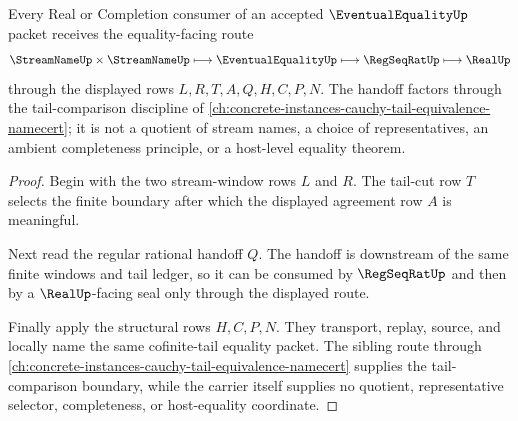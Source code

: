 \begin{theorem}
\label{thm:eventual-equality-regseqrat-handoff}
Every Real or Completion consumer of an accepted $\EventualEqualityUp$ packet receives the equality-facing route
$$
\StreamNameUp \times \StreamNameUp \longmapsto \EventualEqualityUp \longmapsto \RegSeqRatUp \longmapsto \RealUp
$$
through the displayed rows $L,R,T,A,Q,H,C,P,N$. The handoff factors through the tail-comparison discipline of \autoref{ch:concrete-instances-cauchy-tail-equivalence-namecert}; it is not a quotient of stream names, a choice of representatives, an ambient completeness principle, or a host-level equality theorem.
\end{theorem}
\begin{proof}
Begin with the two stream-window rows $L$ and $R$. The tail-cut row $T$ selects the finite boundary after which the displayed agreement row $A$ is meaningful.

Next read the regular rational handoff $Q$. The handoff is downstream of the same finite windows and tail ledger, so it can be consumed by $\RegSeqRatUp$ and then by a $\RealUp$-facing seal only through the displayed route.

Finally apply the structural rows $H,C,P,N$. They transport, replay, source, and locally name the same cofinite-tail equality packet. The sibling route through \autoref{ch:concrete-instances-cauchy-tail-equivalence-namecert} supplies the tail-comparison boundary, while the carrier itself supplies no quotient, representative selector, completeness, or host-equality coordinate.
\end{proof}



\begin{closurestatus}{\EventualEqualityUp}
  \theoryclosure{\seedClosure}
  \formalstatus{\unformalizedV}
\end{closurestatus}
